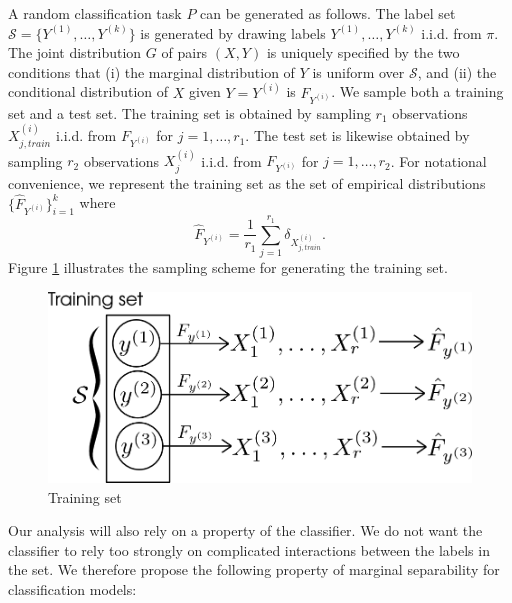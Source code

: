 \documentclass[12pt]{article}
\begin{document}
A random classification task $P$ can be generated as follows.  The
label set $\mathcal{S} = \{Y^{(1)},\hdots, Y^{(k)}\}$ is generated by
drawing labels $Y^{(1)},\hdots, Y^{(k)}$ i.i.d. from $\pi$.  The joint
distribution $G$ of pairs $(X, Y)$ is uniquely specified by the two
conditions that (i) the marginal distribution of $Y$ is uniform over
$\mathcal{S}$, and (ii) the conditional distribution of $X$ given
$Y=Y^{(i)}$ is $F_{Y^{(i)}}$.  We sample both a training set and a
test set.  The training set is obtained by sampling $r_1$ observations
$X_{j, train}^{(i)}$ i.i.d. from $F_{Y^{(i)}}$ for $j = 1,\hdots,
r_1$.  The test set is likewise obtained by sampling $r_2$
observations $X_j^{(i)}$ i.i.d. from $F_{Y^{(i)}}$ for $j = 1,\hdots,
r_2$.  For notational convenience, we represent the training set as
the set of empirical distributions $\{\hat{F}_{Y^{(i)}}\}_{i=1}^k$
where
\[
\hat{F}_{Y^{(i)}} = \frac{1}{r_1} \sum_{j=1}^{r_1} \delta_{X^{(i)}_{j, train}}.
\]
Figure \ref{fig:training_set} illustrates the sampling scheme for
generating the training set.

\begin{figure}[h]
\centering
\includegraphics[scale = 0.4]{training_set.png}
\caption{Training set}\label{fig:training_set}
\end{figure}

Our analysis will also rely on a property of the classifier. We do not
want the classifier to rely too strongly on complicated interactions
between the labels in the set. We therefore propose the following
property of marginal separability for classification models:
\end{document}
